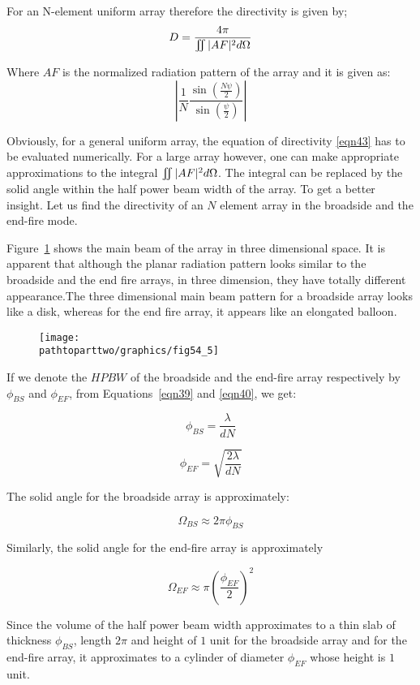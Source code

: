 For an N-element uniform array therefore the directivity is given by;
\begin{equation}
D = \frac{4 \pi}{\iint \arrowvert AF \arrowvert^2 d \Omega}
\label{eqn43}
\end{equation}

Where $AF$ is the normalized radiation pattern of the array and it is given as:
$$
\left\vert \frac{1}{N} \frac{\sin{(\frac{N \psi}{2})}}{\sin{(\frac{ \psi}{2})}} \right\vert
$$

Obviously, for a general uniform array, the equation of directivity \ref{eqn43} has to be evaluated numerically. For a large array however, one can make appropriate approximations to the integral $\iint \arrowvert AF \arrowvert^2 d \Omega$. The integral can be replaced by the solid angle within the half power beam width of the array. To get a better insight. Let us find the directivity of an $N$ element array in the broadside and the end-fire mode.

Figure~\ref{54.8} shows the main beam of the array in three dimensional space. It is apparent that although the planar radiation pattern looks similar to the broadside and the end fire arrays, in three dimension, they have totally different appearance.The three dimensional main beam pattern for a broadside array looks like a disk, whereas for the end fire array, it appears like an elongated balloon.

\begin{figure}[h]
\texttt{[image: \\pathtoparttwo/graphics/fig54\_5]}
\centering
\caption{}
\label{54.8}
\end{figure}

If we denote the $HPBW$ of the broadside and the end-fire array respectively by $\phi_{BS}$ and $\phi_{EF}$, from Equations~\ref{eqn39} and \ref{eqn40}, we get:

$$
\phi_{BS} = \frac{\lambda}{dN}
$$

$$
\phi_{EF} = \sqrt{\frac{2 \lambda}{dN}}
$$

The solid angle for the broadside array is approximately:

$$
\Omega_{BS} \approx 2 \pi \phi_{BS}
$$

Similarly, the solid angle for the end-fire array is approximately

$$
\Omega_{EF} \approx  \pi (\frac{\phi_{EF}}{2})^2
$$

Since the volume of the half power beam width approximates to a thin slab of thickness $\phi_{BS}$, length $2\pi$ and height of $1$ unit for the broadside array and for the end-fire array, it approximates to a cylinder of diameter $\phi_{EF}$ whose height is $1$ unit.

